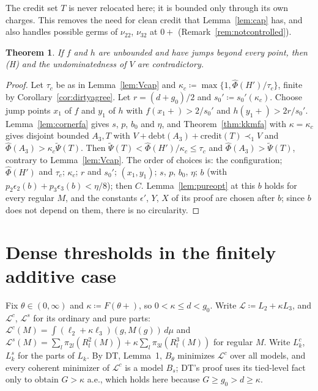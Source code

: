 \documentclass[11pt]{article}
\newtheorem{theorem}{Theorem}
\theoremstyle{definition}\newtheorem{definition}[theorem]{Definition}
\theoremstyle{remark}\newtheorem{remark}[theorem]{Remark}
\newcommand{\debt}{\mathrm{debt}}
\newcommand{\cred}{\mathrm{credit}}
\newcommand{\Phihat}{\widehat\Phi}
\newcommand{\Psitil}{\widetilde\Psi}
\begin{document}
The credit set $T$ is never relocated here; it is bounded only through its
own charges. This removes the need for clean credit that
Lemma~\ref{lem:cap} has, and also handles possible germs of $\nu_{22}$,
$\nu_{32}$ at $0+$ (Remark~\ref{rem:notcontrolled}).

\begin{theorem}\label{thm:residualfa}
If $f$ and $h$ are unbounded and have jumps beyond every point, then (H) and
the undominatedness of $V$ are contradictory.
\end{theorem}
\begin{proof}
Let $\tau_c$ be as in Lemma~\ref{lem:Vcap} and $\kappa_c\coloneqq
\max\{1,\Phihat(H')/\tau_c\}$, finite by Corollary~\ref{cor:dirtyagree}.
Let $r=(d+g_0)/2$ and $s_0'\coloneqq s_0'(\kappa_c)$. Choose jump points
$x_1$ of $f$ and $y_1$ of $h$ with $f(x_1+)>2/s_0'$ and $h(y_1+)>2r/s_0'$.
Lemma~\ref{lem:cornerfa} gives $s$, $p$, $b_0$ and $\eta$, and
Theorem~\ref{thm:kkmfa} with $\kappa=\kappa_c$ gives disjoint bounded $A_3,T$
with $V+\debt(A_3)+\cred(T)\prec_1V$ and $\Phihat(A_3)>\kappa_c\Psitil(T)$.
Then $\Psitil(T)<\Phihat(H')/\kappa_c\le\tau_c$ and $\Phihat(A_3)>
\Psitil(T)$, contrary to Lemma~\ref{lem:Vcap}. The order of choices is: the
configuration; $\Phihat(H')$ and $\tau_c$; $\kappa_c$; $r$ and $s_0'$;
$(x_1,y_1)$; $s$, $p$, $b_0$, $\eta$; $b$ (with
$p_2\epsilon_2(b)+p_3\epsilon_3(b)<\eta/8$); then $C$. Lemma~\ref{lem:pureopt}
at this $b$ holds for every regular $M$, and the constants $\epsilon'$, $Y$,
$X$ of its proof are chosen after $b$; since $b$ does not depend on them,
there is no circularity.
\end{proof}

\section{Dense thresholds in the finitely additive case}\label{sec:dense}

Fix $\theta\in(0,\infty)$ and $\kappa\coloneqq F(\theta+)$, so $0<\kappa\le
d<g_0$. Write $\mathcal L\coloneqq L_2+\kappa L_3$, and $\mathcal L^c$, $\mathcal L^s$ for its ordinary
and pure parts:
$\mathcal L^c(M)=\int(\ell_2+\kappa\ell_3)(g,M(g))\,d\mu$ and
$\mathcal L^s(M)=\sum_l\pi_{2l}(R^2_l(M))+\kappa\sum_l\pi_{3l}(R^3_l(M))$ for regular
$M$. Write $L_k^c$, $L_k^s$ for the parts of $L_k$. By DT, Lemma~1, $B_\theta$
minimizes $\mathcal L^c$ over all models, and every coherent minimizer of $\mathcal L^c$ is a
model $B_s$; DT's proof uses its tied-level fact only to obtain $G>\kappa$
a.e., which holds here because $G\ge g_0>d\ge\kappa$.
\end{document}
